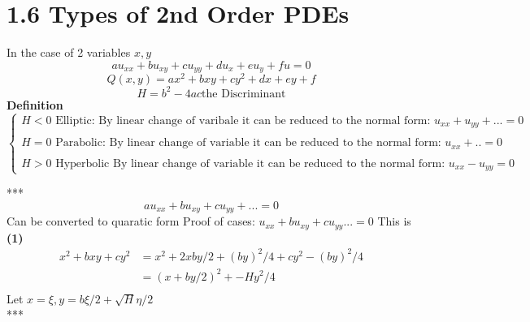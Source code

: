 \documentclass{article}
\begin{document}
\section*{1.6 Types of 2nd Order PDEs}
In the case of 2 variables $x,y$\\
$$au_{xx} + bu_{xy} + cu_{yy} + du_x + eu_y + fu = 0$$
$$Q(x,y) = ax^2 + bxy + cy^2 + dx + ey + f$$
$$H = b^2 - 4ac \text{the Discriminant}$$
\textbf{Definition}
$$\begin{cases}
    H < 0 \text{ Elliptic: By linear change of varibale it can be reduced to the normal form: } u_{xx} + u_{yy} + ... = 0\\\\
    H = 0 \text{ Parabolic: By linear change of variable it can be reduced to the normal form: } u_{xx} + .. = 0\\\\
    H > 0 \text{ Hyperbolic By linear change of variable it can be reduced to the normal form: } u_{xx} - u_{yy} = 0
\end{cases}$$

***
$$au_{xx} + bu_{xy} + cu_{yy} + ... = 0$$
Can be converted to quaratic form
Proof of cases: 
$u_{xx} + bu_{xy} + cu_{yy} ... = 0$ This is \textbf{(1)}\\
\begin{align*}
    x^2 +bxy +cy^2 &= x^2 + 2xby/2 + (by)^2/4 + cy^2 - (by)^2/4 \\
    &= (x+by/2)^2 + -Hy^2/4\\
\end{align*}
Let $x = \xi, y = b\xi/2 + \sqrt{H}\eta/2 $\\
***
\end{document}
